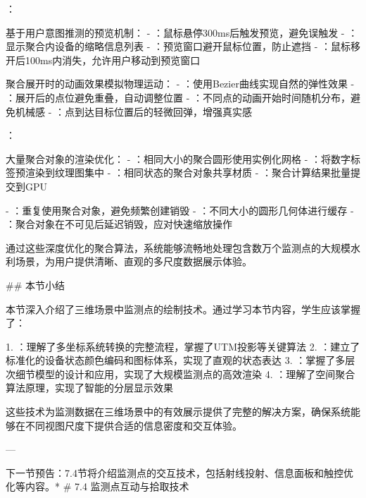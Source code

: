 {：

基于用户意图推测的预览机制：
- ：鼠标悬停300ms后触发预览，避免误触发
- ：显示聚合内设备的缩略信息列表
- ：预览窗口避开鼠标位置，防止遮挡
- ：鼠标移开后100ms内消失，允许用户移动到预览窗口

聚合展开时的动画效果模拟物理运动：
- ：使用Bezier曲线实现自然的弹性效果
- ：展开后的点位避免重叠，自动调整位置
- ：不同点的动画开始时间随机分布，避免机械感
- ：点到达目标位置后的轻微回弹，增强真实感

：

大量聚合对象的渲染优化：
- ：相同大小的聚合圆形使用实例化网格
- ：将数字标签预渲染到纹理图集中
- ：相同状态的聚合对象共享材质
- ：聚合计算结果批量提交到GPU

- ：重复使用聚合对象，避免频繁创建销毁
- ：不同大小的圆形几何体进行缓存
- ：聚合对象在不可见后延迟销毁，应对快速缩放操作

通过这些深度优化的聚合算法，系统能够流畅地处理包含数万个监测点的大规模水利场景，为用户提供清晰、直观的多尺度数据展示体验。

## 本节小结

本节深入介绍了三维场景中监测点的绘制技术。通过学习本节内容，学生应该掌握了：

1. ：理解了多坐标系统转换的完整流程，掌握了UTM投影等关键算法
2. ：建立了标准化的设备状态颜色编码和图标体系，实现了直观的状态表达
3. ：掌握了多层次细节模型的设计和应用，实现了大规模监测点的高效渲染
4. ：理解了空间聚合算法原理，实现了智能的分层显示效果

这些技术为监测数据在三维场景中的有效展示提供了完整的解决方案，确保系统能够在不同视图尺度下提供合适的信息密度和交互体验。

---

}下一节预告：7.4节将介绍监测点的交互技术，包括射线投射、信息面板和触控优化等内容。* \# 7.4 监测点互动与拾取技术


